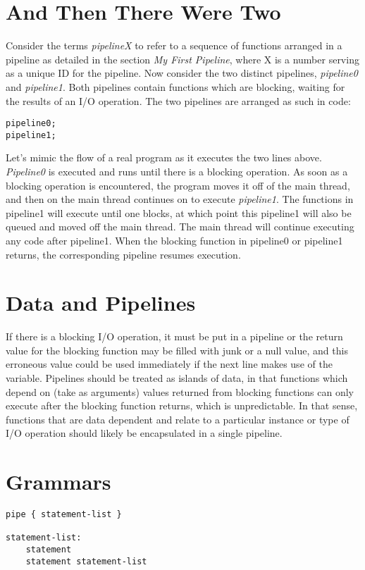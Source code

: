 \documentclass[./LRM_main.tex]{subfiles}
\begin{document}
\section{And Then There Were Two}
Consider the terms \textit{pipelineX} to refer to a sequence of functions arranged in a pipeline as detailed in the section \textit{My First Pipeline}, where X is a number serving as a unique ID for
the pipeline. Now consider the two distinct pipelines, \textit{pipeline0} and \textit{pipeline1}. Both pipelines contain functions which are blocking, waiting for the results of an I/O operation. The two pipelines are arranged as such in code:
\begin{lstlisting}
pipeline0;
pipeline1;
\end{lstlisting}
Let's mimic the flow of a real program as it executes the two lines above. \textit{Pipeline0} is executed and runs until there is a blocking operation. As soon as a blocking operation is encountered,
the program moves it off of the main thread, and then on the main thread continues on to execute \textit{pipeline1}. The functions in pipeline1 will execute until one blocks, at which point this pipeline1 will also be queued and moved off the main thread. The main thread will continue executing any code after pipeline1. When the blocking function in pipeline0 or pipeline1 returns, the corresponding pipeline resumes execution.   


\section{Data and Pipelines}
If there is a blocking I/O operation, it must be put in a pipeline or the return value for the blocking function may be filled with junk or a null value, and this erroneous value could be used immediately if the next line makes use of the variable. Pipelines should be treated as islands of data, in that functions which depend on (take as arguments) values returned from blocking functions can only execute after the blocking function returns, which is unpredictable. In that sense, functions that are data dependent and relate to a particular instance or type of I/O operation should likely be encapsulated in a single pipeline. 

\section{Grammars}
\begin{lstlisting}
pipe { statement-list }

statement-list:
    statement
    statement statement-list
\end{lstlisting}
\end{document}
